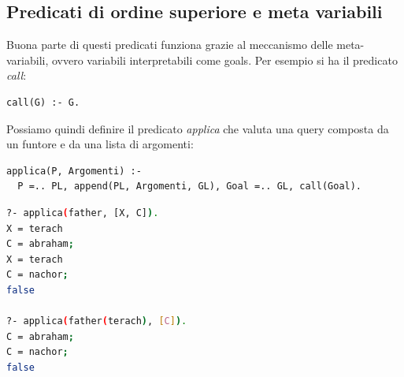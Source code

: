 \documentclass[a4paper,12pt, oneside]{book}
\begin{document}
\subsection{Predicati di ordine superiore e meta variabili}
Buona parte di questi predicati funziona grazie al meccanismo
delle meta-variabili, ovvero variabili interpretabili come goals. Per esempio si ha il predicato \textit{call}:
\begin{verbatim}
call(G) :- G.
\end{verbatim}
Possiamo quindi definire il predicato \textit{applica }che valuta una query composta da un funtore e da una lista di argomenti:
\begin{verbatim}
applica(P, Argomenti) :-
  P =.. PL, append(PL, Argomenti, GL), Goal =.. GL, call(Goal).
\end{verbatim}
\begin{shaded}
	\begin{lstlisting}[language=bash]
?- applica(father, [X, C]).
X = terach
C = abraham;
X = terach
C = nachor;
false

?- applica(father(terach), [C]).
C = abraham;
C = nachor;
false
\end{lstlisting}
\end{shaded}
\end{document}
